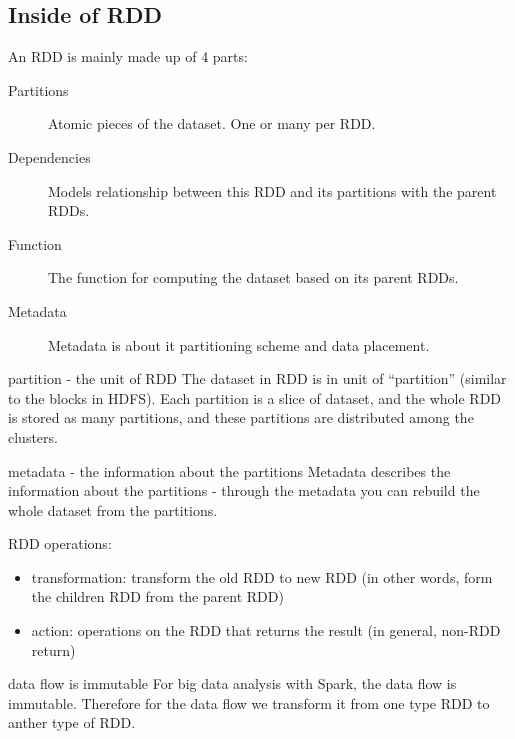 \documentclass[notheorems, aspectratio=54]{beamer}
\begin{document}
\subsection{Inside of RDD}
\begin{frame}

An RDD is mainly made up of 4 parts:
\begin{description}
 \item [Partitions] Atomic pieces of the dataset. One or many per RDD.
 \item [Dependencies] Models relationship between this RDD and its partitions with the parent RDDs.
 \item [Function] The function for computing the dataset based on its parent RDDs.
 \item [Metadata] Metadata is about it partitioning scheme and data placement.
\end{description}

\end{frame}



\begin{frame}

\begin{block}{partition - the unit of RDD}
 The dataset in RDD is in unit of ``partition'' (similar to the blocks in HDFS). 
 Each partition is a slice of dataset, and the whole RDD is stored as 
 many partitions, and these partitions are distributed among the clusters.
\end{block}

\begin{block}{metadata - the information about the partitions}
 Metadata describes the information about the partitions - through the metadata you
 can rebuild the whole dataset from the partitions.
\end{block}

\end{frame}


\begin{frame}

RDD operations:
\begin{itemize}
 \item transformation: transform the old RDD to new RDD (in other words,
form the children RDD from the parent RDD)
 \item action: operations on the RDD that returns the result (in general, 
 non-RDD return)
\end{itemize}

\begin{alertblock}{data flow is immutable}
 For big data analysis with Spark, the data flow is immutable. Therefore for the data flow we 
 transform it from one type RDD to anther type of RDD. 
\end{alertblock}

\end{frame}
\end{document}
